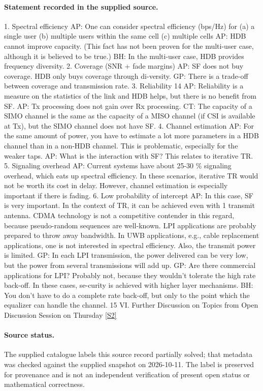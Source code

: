 \documentclass[11pt]{article}
\newcommand{\sref}[2]{\hyperlink{source:#1:#2}{[S#2]}}
\begin{document}
\paragraph{Statement recorded in the supplied source.}
1. Spectral efficiency AP: One can consider spectral efficiency (bps/Hz) for (a) a single user (b) multiple users within the same cell (c) multiple cells AP: HDB cannot improve capacity. (This fact has not been proven for the multi-user case, although it is believed to be true.) BH: In the multi-user case, HDB provides frequency diversity. 2. Coverage (SNR + fade margins) AP: SF does not buy coverage. HDB only buys coverage through di-versity. GP: There is a trade-off between coverage and transmission rate. 3. Reliability 14 AP: Reliability is a measure on the statistics of the link and HDB helps, but there is no benefit from SF. AP: Tx processing does not gain over Rx processing. CT: The capacity of a SIMO channel is the same as the capacity of a MISO channel (if CSI is available at Tx), but the SIMO channel does not have SF. 4. Channel estimation AP: For the same amount of power, you have to estimate a lot more parameters in a HDB channel than in a non-HDB channel. This is problematic, especially for the weaker taps. AP: What is the interaction with SF? This relates to iterative TR. 5. Signaling overhead AP: Current systems have about 25-30 \% signaling overhead, which eats up spectral efficiency. In these scenarios, iterative TR would not be worth its cost in delay. However, channel estimation is especially important if there is fading. 6. Low probability of intercept AP: In this case, SF is very important. In the context of TR, it can be achieved even with 1 transmit antenna. CDMA technology is not a competitive contender in this regard, because pseudo-random sequences are well-known. LPI applications are probably prepared to throw away bandwidth. In UWB applications, e.g., cable replacement applications, one is not interested in spectral efficiency. Also, the transmit power is limited. GP: In each LPI transmission, the power delivered can be very low, but the power from several transmissions will add up. GP: Are there commercial applications for LPI? Probably not, because they wouldn't tolerate the high rate back-off. In these cases, se-curity is achieved with higher layer mechanisms. BH: You don't have to do a complete rate back-off, but only to the point which the equalizer can handle the channel. 15 VI. Further Discussion on Topics from Open Discussion Session on Thursday \sref{20001176}{2}
\paragraph{Source status.}
The supplied catalogue labels this source record partially solved; that metadata was checked against the supplied snapshot on 2026-10-11. The label is preserved for provenance and is not an independent verification of present open status or mathematical correctness.
\end{document}
